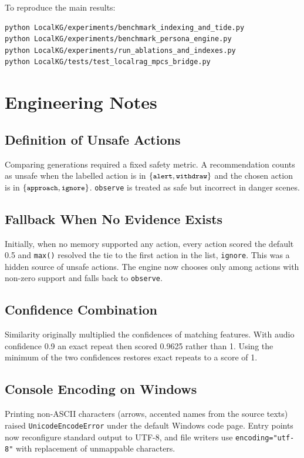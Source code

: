 \documentclass[12pt,a4paper,oneside]{report}
\newcommand{\code}[1]{\texttt{\small #1}}
\begin{document}
\noindent To reproduce the main results:
\begin{lstlisting}[language=bash]
python LocalKG/experiments/benchmark_indexing_and_tide.py
python LocalKG/experiments/benchmark_persona_engine.py
python LocalKG/experiments/run_ablations_and_indexes.py
python LocalKG/tests/test_localrag_mpcs_bridge.py
\end{lstlisting}

\chapter{Engineering Notes}\label{app:eng}
\section{Definition of Unsafe Actions}
Comparing generations required a fixed safety metric. A recommendation counts as unsafe when the labelled action is in $\{\code{alert}, \code{withdraw}\}$ and the chosen action is in $\{\code{approach}, \code{ignore}\}$. \code{observe} is treated as safe but incorrect in danger scenes.

\section{Fallback When No Evidence Exists}
Initially, when no memory supported any action, every action scored the default 0.5 and \code{max()} resolved the tie to the first action in the list, \code{ignore}. This was a hidden source of unsafe actions. The engine now chooses only among actions with non-zero support and falls back to \code{observe}.

\section{Confidence Combination}
Similarity originally multiplied the confidences of matching features. With audio confidence 0.9 an exact repeat then scored 0.9625 rather than 1. Using the minimum of the two confidences restores exact repeats to a score of 1.

\section{Console Encoding on Windows}
Printing non-ASCII characters (arrows, accented names from the source texts) raised \code{UnicodeEncodeError} under the default Windows code page. Entry points now reconfigure standard output to UTF-8, and file writers use \code{encoding="utf-8"} with replacement of unmappable characters.
\end{document}
